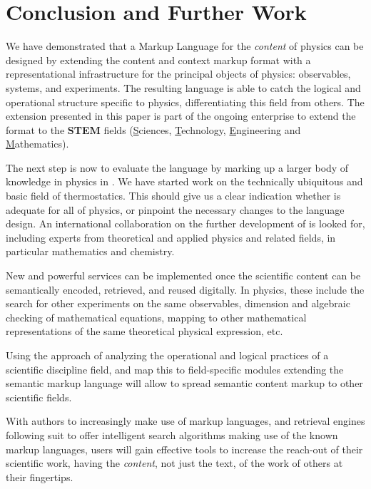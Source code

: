 \documentclass{llncs}
\def\physml{{\sc{PhysML}}}
\def\omdoc{\sc{OMDoc}}
\begin{document}
\section{Conclusion and Further Work}\label{sec:conclusion}

We have demonstrated that a Markup Language for the {\emph{content}} of physics can be
designed by extending the content and context markup format {\omdoc} with a
representational infrastructure for the principal objects of physics: observables,
systems, and experiments. The resulting language {\physml} is able to catch the logical
and operational structure specific to physics, differentiating this field from others. The
extension presented in this paper is part of the ongoing enterprise to extend the {\omdoc}
format to the {\bf{STEM}} fields ({\underline{S}}ciences, {\underline{T}}echnology,
{\underline{E}}ngineering and {\underline{M}}athematics).


The next step is now to evaluate the language by marking up a larger body of knowledge in
physics in {\physml}.  We have started work on the technically ubiquitous and basic field
of thermostatics. This should give us a clear indication whether {\physml} is adequate for
all of physics, or pinpoint the necessary changes to the language design.  An
international collaboration on the further development of {\physml} is looked for,
including experts from theoretical and applied physics and related fields, in particular
mathematics and chemistry.

New and powerful services can be implemented once the scientific content can be
semantically encoded, retrieved, and reused digitally.  In physics, these include the
search for other experiments on the same observables, dimension and algebraic checking of
mathematical equations, mapping to other mathematical representations of the same
theoretical physical expression, etc.

Using the approach of analyzing the operational and logical practices of a scientific
discipline field, and map this to field-specific modules extending the semantic markup
language {\omdoc} will allow to spread semantic content markup to other scientific fields.

With authors to increasingly make use of markup languages, and retrieval engines
following suit to offer intelligent search algorithms making use of the known markup
languages, users will gain effective tools to increase the reach-out of their scientific work,
having the {\emph{content}}, not just the text, of the work of others at their fingertips.




\end{document}
